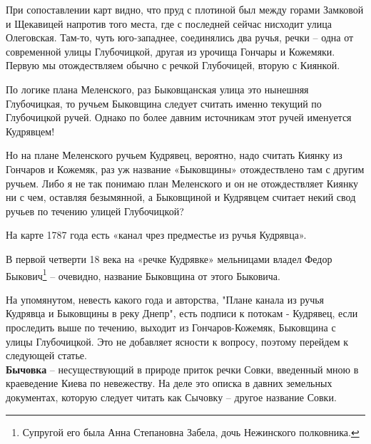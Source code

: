При сопоставлении карт видно, что пруд с плотиной был между горами Замковой и Щекавицей напротив того места, где с последней сейчас нисходит улица Олеговская. Там-то, чуть юго-западнее, соединялись два ручья, речки – одна от современной улицы Глубочицкой, другая из урочища Гончары и Кожемяки. Первую мы отождествляем обычно с речкой Глубочицей, вторую с Киянкой.

По логике плана Меленского, раз Быковщанская улица это нынешняя Глубочицкая, то ручьем Быковщина следует считать именно текущий по Глубочицкой ручей. Однако по более давним источникам этот ручей именуется Кудрявцем!

Но на плане Меленского ручьем Кудрявец, вероятно, надо считать Киянку из Гончаров и Кожемяк, раз уж название «Быковщины» отождествлено там с другим ручьем. Либо я не так понимаю план Меленского и он не отождествляет Киянку ни с чем, оставляя безымянной, а Быковщиной и Кудрявцем считает некий свод ручьев по течению улицей Глубочицкой?

На карте 1787 года есть «канал чрез предместье из ручья Кудрявца».

В первой четверти 18 века на «речке Кудрявке» мельницами владел Федор Быкович\footnote{Супругой его была Анна Степановна Забела, дочь Нежинского полковника.} – очевидно, название Быковщина от этого Быковича.

На упомянутом, невесть какого года и авторства, "Плане канала из ручья Кудрявца и Быковщины в реку Днепр", есть подписи к потокам - Кудрявец, если проследить выше по течению, выходит из Гончаров-Кожемяк, Быковщина с улицы Глубочицкой. Это не добавляет ясности к вопросу, поэтому перейдем к следующей статье.\\

\textbf{Бычовка} – несуществующий в природе приток речки Совки, введенный мною в краеведение Киева по невежеству. На деле это описка в давних земельных документах, которую следует читать как Сычовку – другое название Совки.
